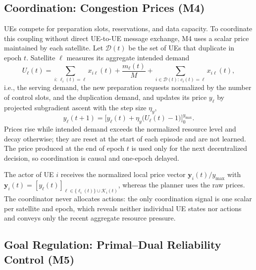 \documentclass[journal]{IEEEtran}
\begin{document}
\subsection{Coordination: Congestion Prices (M4)}
\label{sec:coord}

UEs compete for preparation slots, reservations, and data capacity. To
coordinate this coupling without direct UE-to-UE message exchange, M4 uses a
scalar price maintained by each satellite. Let $\mathcal{D}(t)$
be the set of UEs that duplicate in epoch $t$. Satellite $\ell$ measures its
aggregate intended demand
\begin{equation}
U_\ell(t)=\sum_{i:\,\ell_i(t)=\ell}x_{i\ell}(t)+\frac{m_\ell(t)}{M}+\sum_{i\in\mathcal{D}(t):\,c_i(t)=\ell}x_{i\ell}(t),
\end{equation}
i.e., the serving demand, the new preparation requests normalized by the
number of control slots, and the duplication demand, and updates its price
$y_\ell$ by projected subgradient ascent with the step size $\eta_y$,
\begin{equation}
y_\ell(t+1)=\Big[y_\ell(t)+\eta_y\big(U_\ell(t)-1\big)\Big]_0^{y_{\max}}.
\label{eq:price}
\end{equation}
Prices rise while intended demand exceeds the normalized resource level and
decay otherwise; they are reset at the start of each episode and are not
learned. The price produced at the end of epoch $t$ is used only for the next
decentralized decision, so coordination is causal and one-epoch delayed.

The actor of UE $i$ receives the normalized local price vector
$\mathbf{y}_i(t)/y_{\max}$ with
$\mathbf{y}_i(t)=[y_\ell(t)]_{\ell\in\{\ell_i(t)\}\cup\mathcal{K}_i(t)}$,
whereas the planner uses the raw prices. The coordinator never allocates
actions: the only coordination signal is one scalar per satellite and epoch,
which reveals neither individual UE states nor actions and conveys only the
recent aggregate resource pressure.

\subsection{Goal Regulation: Primal--Dual Reliability Control (M5)}
\label{sec:m5}
\end{document}

